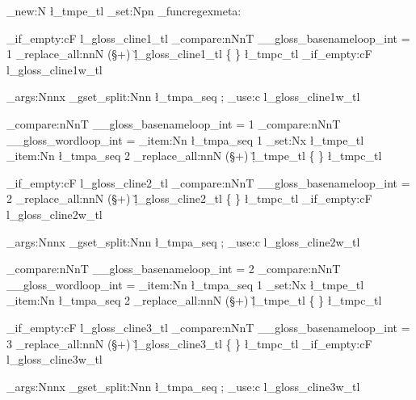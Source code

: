 \tl_new:N \l_tmpe_tl
	\cs_set:Npn \gl_funcregexmeta:  { 








		\tl_if_empty:cF { l_gloss_cline1_tl }
		{  
		\int_compare:nNnT
								  { \g__gloss_basenameloop_int } = { 1 }
								  {
		\regex_replace_all:nnN
				{ (\S+) }
				{ \c{\u{l_gloss_cline1_tl}} \cB\{ \0 \cE\} }
				\l_tmpc_tl
												}%
			}%
		\tl_if_empty:cF { l_gloss_cline1w_tl }
		{  
			\exp_args:Nnnx
	\seq_gset_split:Nnn 
		\l_tmpa_seq
			{ ; } %
			{ \tl_use:c { l_gloss_cline1w_tl } }
			
		\int_compare:nNnT
								  { \g__gloss_basenameloop_int } = { 1 }
								  {
		\int_compare:nNnT
								  { \g__gloss_wordloop_int } = { \seq_item:Nn \l_tmpa_seq { 1 } }
								  {
\tl_set:Nx \l_tmpe_tl { \seq_item:Nn \l_tmpa_seq { 2 } }
		\regex_replace_all:nnN
				{ (\S+) }
				{ \c{\u{l_tmpe_tl}} \cB\{ \0 \cE\} }
				\l_tmpc_tl
												}}%
			}%
		\tl_if_empty:cF { l_gloss_cline2_tl }
		{  
		\int_compare:nNnT
								  { \g__gloss_basenameloop_int } = { 2 }
								  {
		\regex_replace_all:nnN
				{ (\S+) }
				{ \c{\u{l_gloss_cline2_tl}} \cB\{ \0 \cE\} }
				\l_tmpc_tl
												}%
			}%
		\tl_if_empty:cF { l_gloss_cline2w_tl }
		{  
			\exp_args:Nnnx
	\seq_gset_split:Nnn 
		\l_tmpa_seq
			{ ; } %
			{ \tl_use:c { l_gloss_cline2w_tl } }
			
		\int_compare:nNnT
								  { \g__gloss_basenameloop_int } = { 2 }
								  {
		\int_compare:nNnT
								  { \g__gloss_wordloop_int } = { \seq_item:Nn \l_tmpa_seq { 1 } }
								  {
\tl_set:Nx \l_tmpe_tl { \seq_item:Nn \l_tmpa_seq { 2 } }
		\regex_replace_all:nnN
				{ (\S+) }
				{ \c{\u{l_tmpe_tl}} \cB\{ \0 \cE\} }
				\l_tmpc_tl
												}}%
			}%
		\tl_if_empty:cF { l_gloss_cline3_tl }
		{  
		\int_compare:nNnT
								  { \g__gloss_basenameloop_int } = { 3 }
								  {
		\regex_replace_all:nnN
				{ (\S+) }
				{ \c{\u{l_gloss_cline3_tl}} \cB\{ \0 \cE\} }
				\l_tmpc_tl
												}%
			}%
		\tl_if_empty:cF { l_gloss_cline3w_tl }
		{  
			\exp_args:Nnnx
	\seq_gset_split:Nnn 
		\l_tmpa_seq
			{ ; } %
			{ \tl_use:c { l_gloss_cline3w_tl } }
			
}}
